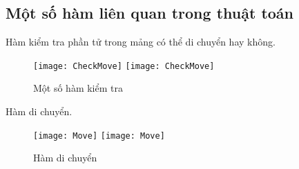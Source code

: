 \subsection{Một số hàm liên quan trong thuật toán}
Hàm kiểm tra phần tử trong mảng có thể di chuyển hay không.\\
\begin{figure}[!htbp]
  \begin{center}
    \leavevmode
    \ifpdf
      \texttt{[image: CheckMove]}
    \else
      \texttt{[image: CheckMove]}
    \fi
    \caption{Một số hàm kiểm tra}
    \label{FigAir}
   
  \end{center}
\end{figure}
\FloatBarrier
Hàm di chuyển.\\
\begin{figure}[!htbp]
  \begin{center}
    \leavevmode
    \ifpdf
      \texttt{[image: Move]}
    \else
      \texttt{[image: Move]}
    \fi
    \caption{Hàm di chuyển}
    \label{FigAir}
   
  \end{center}
\end{figure}
\FloatBarrier

